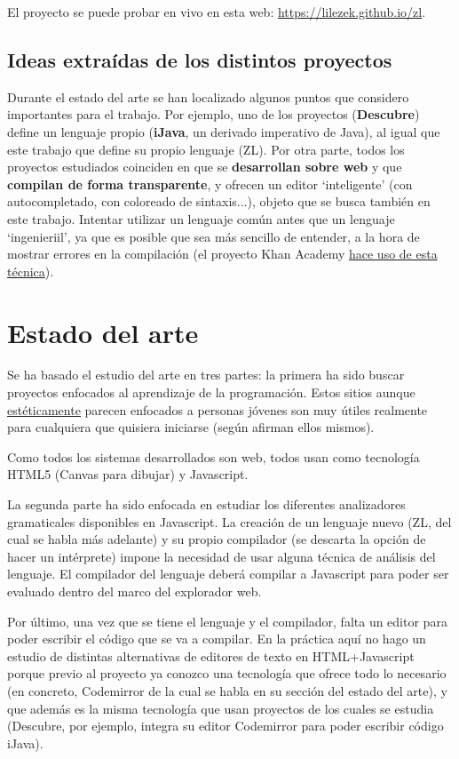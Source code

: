 \documentclass{report}
\begin{document}
	El proyecto se puede probar en vivo en esta web: \href{https://lilezek.github.io/zl}{https://lilezek.github.io/zl}.
	
	\section{Ideas extraídas de los distintos proyectos}
	
	Durante el estado del arte se han localizado algunos puntos que considero importantes para el trabajo. Por ejemplo, uno de los proyectos (\textbf{Descubre}) define un lenguaje propio (\textbf{iJava}, un derivado imperativo de Java), al igual que este trabajo que define su propio lenguaje (ZL). Por otra parte, todos los proyectos estudiados coinciden en que se \textbf{desarrollan sobre web} y que \textbf{compilan de forma transparente}, y ofrecen un editor `inteligente' (con autocompletado, con coloreado de sintaxis...), objeto que se busca también en este trabajo. Intentar utilizar un lenguaje común antes que un lenguaje `ingenieriil', ya que es posible que sea más sencillo de entender, a la hora de mostrar errores en la compilación (el proyecto Khan Academy \hyperref[app:d]{hace uso de esta técnica}).
	
	\chapter{Estado del arte}
	

	Se ha basado el estudio del arte en tres partes: la primera ha sido buscar proyectos enfocados al aprendizaje de la programación. Estos sitios aunque \hyperref[app:b]{estéticamente} parecen enfocados a personas jóvenes son muy útiles realmente para cualquiera que quisiera iniciarse (según afirman ellos mismos).  
	
	Como todos los sistemas desarrollados son web, todos usan como tecnología HTML5 (Canvas para dibujar) y Javascript.

	La segunda parte ha sido enfocada en estudiar los diferentes analizadores gramaticales disponibles en Javascript. La creación de un lenguaje nuevo (ZL, del cual se habla más adelante) y su propio compilador (se descarta la opción de hacer un intérprete) impone la necesidad de usar alguna técnica de análisis del lenguaje. El compilador del lenguaje deberá compilar a Javascript para poder ser evaluado dentro del marco del explorador web.
	
	Por último, una vez que se tiene el lenguaje y el compilador, falta un editor para poder escribir el código que se va a compilar. En la práctica aquí no hago un estudio de distintas alternativas de editores de texto en HTML+Javascript porque previo al proyecto ya conozco una tecnología que ofrece todo lo necesario (en concreto, Codemirror de la cual se habla en su sección del estado del arte), y que además es la misma tecnología que usan proyectos de los cuales se estudia (Descubre, por ejemplo, integra su editor Codemirror para poder escribir código iJava).
	
\end{document}
